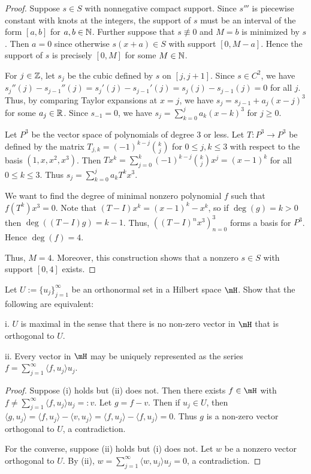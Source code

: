 \documentclass{article}
\begin{document}
\begin{proof}
Suppose $s \in S$ with nonnegative compact support. Since $s'''$ is piecewise constant with knots at the integers, the support of $s$ must be an interval of the form $[a,b]$ for $a,b \in \mathbb{N}$. Further suppose that $s \not \equiv 0$ and $M = b$ is minimized by $s$. Then $a = 0$ since otherwise $s(x+a) \in S$ with support $[0, M-a]$.  Hence the support of $s$ is precisely $[0,M]$ for some $M \in \mathbb{N}$.

For $j \in \mathbb{Z}$, let $s_j$ be the cubic defined by $s$ on $[j, j+1]$. Since $s \in C^2$, we have $s_{j}''(j) - s_{j-1}''(j) = s_{j}'(j) - s_{j-1}'(j) = s_{j}(j) - s_{j-1}(j) = 0$ for all $j$.  Thus, by comparing Taylor expansions at $x = j$, we have $s_{j} = s_{j-1} + a_j (x-j)^3$ for some $a_{j} \in \mathbb{R}$. Since $s_{-1} = 0$, we have $s_j = \sum_{k=0}^{j} a_k (x - k)^3$ for $j \ge 0$.

Let $P^3$ be the vector space of polynomials of degree $3$ or less. Let $T: P^3 \to P^3$ be defined by the matrix $T_{j,k} = (-1)^{k-j} {k \choose j}$ for $0 \le j,k \le 3$ with respect to the basis $(1, x, x^2, x^3)$. Then $T x^k = \sum_{j=0}^k (-1)^{k-j} {k \choose j} x^j = (x-1)^k$ for all $0 \le k \le 3$. Thus $s_j = \sum_{k=0}^{j} a_k T^k x^3$.

 We want to find the degree of minimal nonzero polynomial $f$ such that $f(T^k)x^3  = 0$. Note that $(T - I) x^k = (x - 1)^k - x^k$, so if $\deg(g) = k > 0$ then $\deg((T-I)g) = k - 1$.  Thus, $((T-I)^n x^3)_{n=0}^3$ forms a basis for $P^3$. Hence $\deg(f) = 4$.

Thus, $M = 4$. Moreover, this construction shows that a nonzero $s \in S$ with support $[0,4]$ exists.
\end{proof}

 Let $U := \{u_j\}_{j=1}^\infty$ be an orthonormal set in a Hilbert space $\mH$. Show that the following are equivalent:

i. $U$ is maximal in the sense that there is no non-zero vector in $\mH$ that is orthogonal to $U$.

ii. Every vector in $\mH$ may be uniquely represented as the series $f = \sum_{j=1}^\infty \langle f , u_j \rangle u_j$.

\begin{proof}
Suppose (i) holds but (ii) does not.  Then there exists $f \in \mH$ with $f \neq \sum_{j=1}^\infty \langle f , u_j \rangle u_j =: v$.  Let $g = f - v$.  Then if $u_j \in U$, then $\langle g, u_j \rangle = \langle f, u_j \rangle - \langle v, u_j \rangle = \langle f, u_j \rangle - \langle f, u_j \rangle = 0$. Thus $g$ is a non-zero vector orthogonal to $U$, a contradiction.

For the converse, suppose (ii) holds but (i) does not. Let $w$ be a nonzero vector orthogonal to $U$.  By (ii), $w = \sum_{j=1}^\infty \langle w, u_j \rangle u_j = 0$, a contradiction.
\end{proof}
\end{document}
